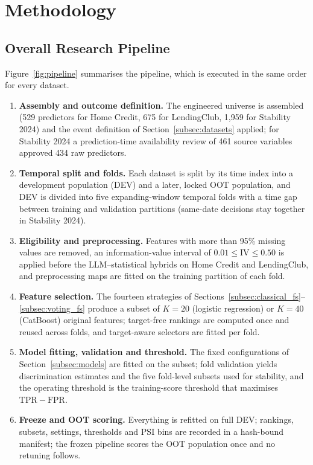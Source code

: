 \documentclass[final,5p,twocolumn]{elsarticle}
\newcommand{\Kfeat}{K}
\newcommand{\TPR}{\mathrm{TPR}}
\newcommand{\FPR}{\mathrm{FPR}}
\begin{document}

\section{Methodology}
\label{sec:methodology}

\subsection{Overall Research Pipeline}
\label{subsec:pipeline}

Figure~\ref{fig:pipeline} summarises the pipeline, which is executed in the same order for every dataset.
\begin{enumerate}
    \item \textbf{Assembly and outcome definition.} The engineered universe is assembled (529 predictors for Home Credit, 675 for LendingClub, 1,959 for Stability 2024) and the event definition of Section~\ref{subsec:datasets} applied; for Stability 2024 a prediction-time availability review of 461 source variables approved 434 raw predictors.
    \item \textbf{Temporal split and folds.} Each dataset is split by its time index into a development population (DEV) and a later, locked OOT population, and DEV is divided into five expanding-window temporal folds with a time gap between training and validation partitions (same-date decisions stay together in Stability 2024).
    \item \textbf{Eligibility and preprocessing.} Features with more than 95\% missing values are removed, an information-value interval of $0.01\le\mathrm{IV}\le0.50$ is applied before the LLM--statistical hybrids on Home Credit and LendingClub, and preprocessing maps are fitted on the training partition of each fold.
    \item \textbf{Feature selection.} The fourteen strategies of Sections~\ref{subsec:classical_fs}--\ref{subsec:voting_fs} produce a subset of $\Kfeat=20$ (logistic regression) or $\Kfeat=40$ (CatBoost) original features; target-free rankings are computed once and reused across folds, and target-aware selectors are fitted per fold.
    \item \textbf{Model fitting, validation and threshold.} The fixed configurations of Section~\ref{subsec:models} are fitted on the subset; fold validation yields discrimination estimates and the five fold-level subsets used for stability, and the operating threshold is the training-score threshold that maximises $\TPR-\FPR$.
    \item \textbf{Freeze and OOT scoring.} Everything is refitted on full DEV; rankings, subsets, settings, thresholds and PSI bins are recorded in a hash-bound manifest; the frozen pipeline scores the OOT population once and no retuning follows.
\end{enumerate}
\end{document}
